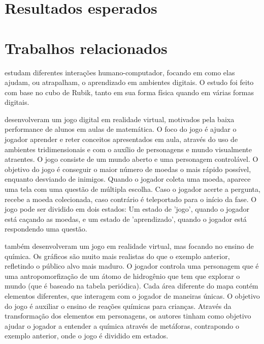 
\section{Resultados esperados}\label{sec-resultados-esperados}


\section{Trabalhos relacionados}\label{sec-trabalhos-relacionados}

\cite{Tabuti:2010:analise} estudam diferentes interações humano-computador, 
focando em como elas ajudam, ou atrapalham, o aprendizado em ambientes 
digitais. O estudo foi feito com base no cubo de Rubik, tanto em sua 
forma física quando em várias formas digitais.

\cite{SBGames:2015:RVAM} desenvolveram um jogo digital em realidade 
virtual, motivados pela baixa performance de alunos em aulas de matemática. 
O foco do jogo é ajudar o jogador aprender e reter conceitos apresentados 
em aula, através do uso de ambientes tridimensionais e com o auxílio de 
personagens e mundo visualmente atraentes. O jogo consiste de um mundo 
aberto e uma personagem controlável. O objetivo do jogo é conseguir o 
maior número de moedas o mais rápido possível, enquanto desviando de 
inimigos. Quando o jogador coleta uma moeda, aparece uma tela com uma questão 
de múltipla escolha. Caso o jogador acerte a pergunta, recebe a moeda 
colecionada, caso contrário é teleportado para o início da fase. O jogo pode 
ser dividido em dois estados: Um estado de 'jogo', quando o jogador está 
caçando as moedas, e um estado de 'aprendizado', quando o jogador está 
respondendo uma questão.

\cite{Alves:2015:VR_Quimica} também desenvolveram um jogo em realidade 
virtual, mas focando no ensino de química. Os gráficos são muito mais 
realistas do que o exemplo anterior, refletindo o público alvo mais 
maduro. O jogador controla uma personagem que é uma antropomorfização 
de um átomo de hidrogênio que tem que explorar o mundo (que é baseado 
na tabela periódica). Cada área diferente do mapa contém elementos 
diferentes, que interagem com o jogador de maneiras únicas. O objetivo 
do jogo é auxiliar o ensino de reações químicas para crianças. Através 
da transformação dos elementos em personagens, os autores tinham como 
objetivo ajudar o jogador a entender a química através de metáforas, 
contrapondo o exemplo anterior, onde o jogo é dividido em estados.
